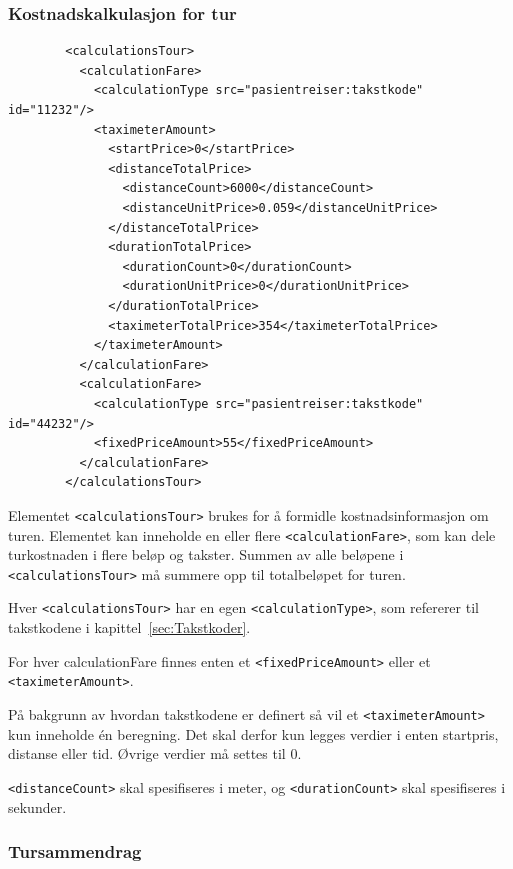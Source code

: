\documentclass[a4paper,titlepage,norsk,11pt]{article}
\begin{document}
\subsubsection{Kostnadskalkulasjon for tur}

\begin{lstlisting}
        <calculationsTour>
          <calculationFare>
            <calculationType src="pasientreiser:takstkode" id="11232"/>
            <taximeterAmount>
              <startPrice>0</startPrice>
              <distanceTotalPrice>
                <distanceCount>6000</distanceCount>
                <distanceUnitPrice>0.059</distanceUnitPrice>
              </distanceTotalPrice>
              <durationTotalPrice>
                <durationCount>0</durationCount>
                <durationUnitPrice>0</durationUnitPrice>
              </durationTotalPrice>
              <taximeterTotalPrice>354</taximeterTotalPrice>
            </taximeterAmount>
          </calculationFare>
          <calculationFare>
            <calculationType src="pasientreiser:takstkode" id="44232"/>
            <fixedPriceAmount>55</fixedPriceAmount>
          </calculationFare>
        </calculationsTour>
\end{lstlisting}

Elementet \lstinline{<calculationsTour>} brukes for å formidle kostnadsinformasjon om turen. Elementet kan inneholde en eller flere \lstinline{<calculationFare>}, som kan dele turkostnaden i flere beløp og takster. Summen av alle beløpene i \lstinline{<calculationsTour>} må summere opp til totalbeløpet for turen.

Hver \lstinline{<calculationsTour>} har en egen \lstinline{<calculationType>}, som refererer til takstkodene i kapittel~\ref{sec:Takstkoder}.

For hver calculationFare finnes enten et \lstinline{<fixedPriceAmount>} eller et \lstinline{<taximeterAmount>}.

På bakgrunn av hvordan takstkodene er definert så vil et \lstinline{<taximeterAmount>} kun inneholde én beregning. Det skal derfor kun legges verdier i enten startpris, distanse eller tid. Øvrige verdier må settes til 0.

\lstinline{<distanceCount>} skal spesifiseres i meter, og \lstinline{<durationCount>} skal spesifiseres i sekunder.

\subsubsection{Tursammendrag}
\end{document}
